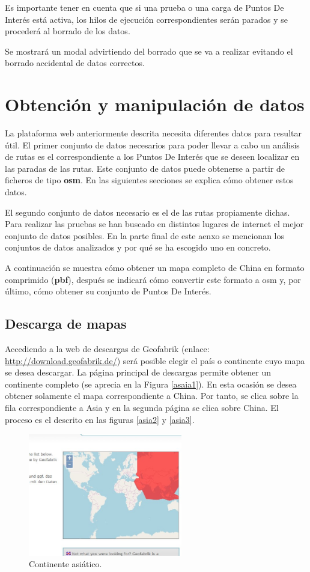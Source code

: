 Es importante tener en cuenta que si una prueba o una carga de Puntos De Interés está activa, los hilos de ejecución correspondientes serán parados y se procederá al borrado de los datos.

Se mostrará un modal advirtiendo del borrado que se va a realizar evitando el borrado accidental de datos correctos.


\section{Obtención y manipulación de datos}
La plataforma web anteriormente descrita necesita diferentes datos para resultar útil. El primer conjunto de datos necesarios para poder llevar a cabo un análisis de rutas es el correspondiente a los Puntos De Interés que se deseen localizar en las paradas de las rutas. Este conjunto de datos puede obtenerse a partir de ficheros de tipo \textbf{osm}. En las siguientes secciones se explica cómo obtener estos datos.

El segundo conjunto de datos necesario es el de las rutas propiamente dichas. Para realizar las pruebas se han buscado en distintos lugares de internet el mejor conjunto de datos posibles. En la parte final de este aenxo se mencionan los conjuntos de datos analizados y por qué se ha escogido uno en concreto.

A continuación se muestra cómo obtener un mapa completo de China en formato comprimido (\textbf{pbf}), después se indicará cómo convertir este formato a osm y, por último, cómo obtener su conjunto de Puntos De Interés.

\subsection{Descarga de mapas}
Accediendo a la web de descargas de Geofabrik (enlace: \url{http://download.geofabrik.de/}) será posible elegir el país o continente cuyo mapa se desea descargar. La página principal de descargas permite obtener un continente completo (se aprecia en la Figura \ref{asaia1}). En esta ocasión se desea obtener solamente el mapa correspondiente a China. Por tanto, se clica sobre la fila correspondiente a Asia y en la segunda página se clica sobre China. El proceso es el descrito en las figuras \ref{asia2} y \ref{asia3}.

\begin{figure}[h]
  \centering
    \includegraphics[width=0.6\textwidth]{../img/manualusuario/asia1.jpg}
  \caption{Continente asiático.}
  \label{asia1}
\end{figure}

